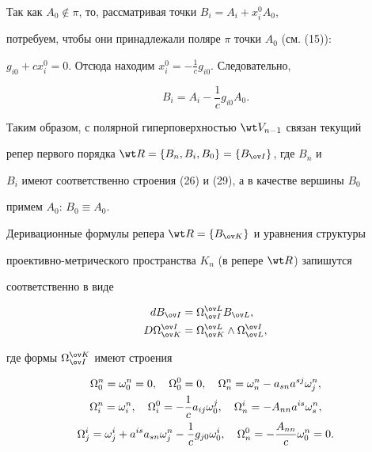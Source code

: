 Так как $A_0\notin\pi$, то, рассматривая точки $B_i=A_i+x^0_i A_0$, 


потребуем, чтобы они принадлежали поляре $\pi$ точки $A_0$ (см. (15)): 


$g_{i0}+c x^0_i=0$. Отсюда находим $x^0_i=-\frac{1}{c}g_{i0}$. Следовательно, 


\begin{equation} 


B_i=A_i-\frac{1}{c}g_{i0}A_0. 


\end{equation} 


 


Таким образом, с полярной гиперповерхностью $\wt V_{n-1}$ связан текущий 


репер первого порядка $\wt R=\{B_n,B_i,B_0\}=\{B_{\ov I}\}$, где $B_n$ и 


$B_i$ имеют соответственно строения (26) и (29), а в качестве вершины $B_0$ 


примем $A_0$: $B_0\equiv A_0$. 


 


Деривационные формулы репера $\wt R=\{B_{\ov K}\}$ и уравнения структуры 


проективно-метрического пространства $K_n$ (в репере $\wt R$) запишутся 


соответственно в виде 


\begin{equation} 


\begin{split} 


dB_{\ov I}&=\Omega^{\ov L}_{\ov I}B_{\ov L},\\ 


D\Omega^{\ov I}_{\ov K}&=\Omega^{\ov L}_{\ov K}\wedge\Omega^{\ov I}_{\ov L}, 


\end{split} 


\end{equation} 


где формы $\Omega^{\ov K}_{\ov I}$ имеют строения 


\begin{gather} 


\Omega^n_0=\omega^n_0=0,\quad \Omega^0_0=0,\quad 


\Omega^n_n=\omega^n_n-a_{sn}a^{sj}\omega^n_j,\notag\\ 


\Omega^n_i=\omega^n_i,\quad \Omega^0_i=-\frac{1}{c} 


a_{ij}\omega^j_0,\quad \Omega^i_n=-A_{nn}a^{is}\omega^n_s,\\ 


\Omega^i_j=\omega^i_j+a^{is}a_{sn}\omega^n_j-\frac{1}{c} 


g_{j0}\omega^i_0,\quad \Omega^0_n=-\frac{A_{nn}}{c}\omega^n_0=0.\notag 


\end{gather} 


